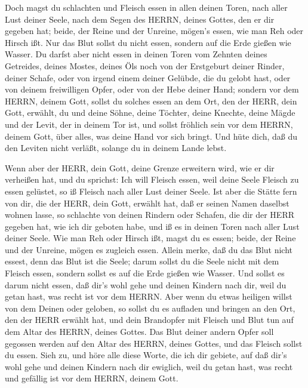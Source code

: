 Doch magst du schlachten und Fleisch essen in allen deinen
Toren, nach aller Lust deiner Seele, nach dem Segen des HERRN, deines
Gottes, den er dir gegeben hat; beide, der Reine und der Unreine,
mögen's essen, wie man Reh oder Hirsch ißt.  Nur das Blut
sollst du nicht essen, sondern auf die Erde gießen wie Wasser.
 Du darfst aber nicht essen in deinen Toren vom Zehnten
deines Getreides, deines Mostes, deines Öls noch von der Erstgeburt
deiner Rinder, deiner Schafe, oder von irgend einem deiner Gelübde, die
du gelobt hast, oder von deinem freiwilligen Opfer, oder von der Hebe
deiner Hand;  sondern vor dem HERRN, deinem Gott, sollst du
solches essen an dem Ort, den der HERR, dein Gott, erwählt, du und deine
Söhne, deine Töchter, deine Knechte, deine Mägde und der Levit, der in
deinem Tor ist, und sollst fröhlich sein vor dem HERRN, deinem Gott,
über alles, was deine Hand vor sich bringt.  Und hüte dich,
daß du den Leviten nicht verläßt, solange du in deinem Lande lebst.

 Wenn aber der HERR, dein Gott, deine Grenze erweitern
wird, wie er dir verheißen hat, und du sprichst: Ich will Fleisch essen,
weil deine Seele Fleisch zu essen gelüstet, so iß Fleisch nach aller
Lust deiner Seele.  Ist aber die Stätte fern von dir, die
der HERR, dein Gott, erwählt hat, daß er seinen Namen daselbst wohnen
lasse, so schlachte von deinen Rindern oder Schafen, die dir der HERR
gegeben hat, wie ich dir geboten habe, und iß es in deinen Toren nach
aller Lust deiner Seele.  Wie man Reh oder Hirsch ißt,
magst du es essen; beide, der Reine und der Unreine, mögen es zugleich
essen.  Allein merke, daß du das Blut nicht essest, denn
das Blut ist die Seele; darum sollst du die Seele nicht mit dem Fleisch
essen,  sondern sollst es auf die Erde gießen wie Wasser.
 Und sollst es darum nicht essen, daß dir's wohl gehe und
deinen Kindern nach dir, weil du getan hast, was recht ist vor dem
HERRN.  Aber wenn du etwas heiligen willst von dem Deinen
oder geloben, so sollst du es aufladen und bringen an den Ort, den der
HERR erwählt hat,  und dein Brandopfer mit Fleisch und Blut
tun auf dem Altar des HERRN, deines Gottes. Das Blut deiner andern Opfer
soll gegossen werden auf den Altar des HERRN, deines Gottes, und das
Fleisch sollst du essen.  Sieh zu, und höre alle diese
Worte, die ich dir gebiete, auf daß dir's wohl gehe und deinen Kindern
nach dir ewiglich, weil du getan hast, was recht und gefällig ist vor
dem HERRN, deinem Gott.

